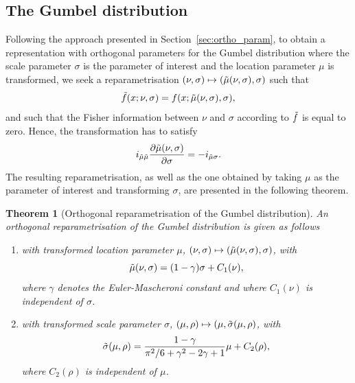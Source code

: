 \documentclass{article}
\newcommand{\1}{\mathds{1}}
\newtheorem{theorem}{Theorem}[section]
\theoremstyle{definition}
\begin{document}
\subsection{The Gumbel distribution}\label{sec:gumbel}
Following the approach presented in Section~\ref{sec:ortho_param}, to obtain a representation with orthogonal parameters for the Gumbel distribution where the scale parameter $\sigma$ is the parameter of interest and the location parameter $\mu$ is transformed, we seek a reparametrisation $(\nu,\sigma) \mapsto (\Tilde{\mu}(\nu,\sigma),\sigma)$ such that
\begin{equation*}
    \Tilde{f}(x;\nu,\sigma) = f(x;\Tilde{\mu}(\nu,\sigma),\sigma),
\end{equation*}
and such that the Fisher information between $\nu$ and $\sigma$ according to $\Tilde{f}$ is equal to zero. %
Hence, the transformation has to satisfy
\begin{equation*}
    i_{\Tilde{\mu} \Tilde{\mu}}\frac{\partial \Tilde{\mu}(\nu,\sigma)}{\partial \sigma} = - i_{\Tilde{\mu}\sigma}.
\end{equation*}
The resulting reparametrisation, as well as the one obtained by taking $\mu$ as the parameter of interest and transforming $\sigma$, are presented in the following theorem.
\begin{theorem}[Orthogonal reparametrisation of the Gumbel distribution]\label{thm:Gumbel}
    An orthogonal reparametrisation of the Gumbel distribution is given as follows
\begin{enumerate}
    \item with transformed location parameter $\mu$,  $(\nu,\sigma) \mapsto (\Tilde{\mu}(\nu,\sigma),\sigma)$, with
    \begin{equation*}
        \Tilde{\mu}(\nu,\sigma) = (1- \gamma)\sigma + C_1(\nu),
    \end{equation*}
    where $\gamma$ denotes the Euler-Mascheroni constant and where $C_1(\nu)$ is independent of $\sigma$.
    \item with transformed scale parameter $\sigma$, $(\mu,\rho) \mapsto (\mu,\Tilde{\sigma}(\mu,\rho)$, with
    \begin{equation*}
        \Tilde{\sigma}(\mu,\rho) = \frac{1- \gamma}{\pi^2/6+\gamma^2 -2\gamma+1}\mu + C_2(\rho),
    \end{equation*}
    where $C_2(\rho)$ is independent of $\mu$.
\end{enumerate}
\end{theorem}
\end{document}
